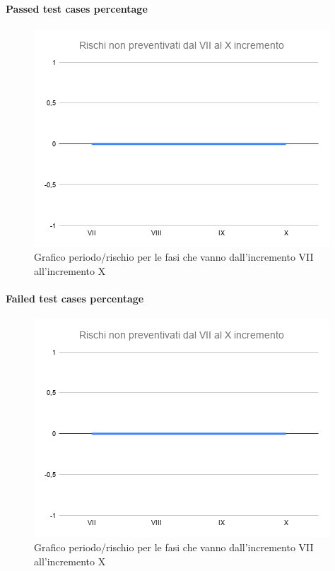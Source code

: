 \paragraph{Passed test cases percentage}
\begin{figure}[H]
			\centering%
			\includegraphics[width=0.8\linewidth]{./res/images/RischiNonPreven_4.png}
			\caption{Grafico periodo/rischio per le fasi che vanno dall'incremento VII all'incremento X}
			\label{fig:Grafico periodo/rischio per le fasi che vanno dall'incremento VII all'incremento X}
	\end{figure}
\paragraph{Failed test cases percentage}
\begin{figure}[H]
			\centering%
			\includegraphics[width=0.8\linewidth]{./res/images/RischiNonPreven_4.png}
			\caption{Grafico periodo/rischio per le fasi che vanno dall'incremento VII all'incremento X}
			\label{fig:Grafico periodo/rischio per le fasi che vanno dall'incremento VII all'incremento X}
	\end{figure}
